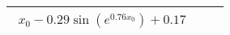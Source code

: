 \begin{center}
\begin{tabular}{|c|c|c|}
$\begin{aligned}x_{0} - 0.29 \sin{\left(e^{0.76 x_{0}} \right)} + 0.17\end{aligned}$\\ \hline\end{tabular}
        \end{center}
        